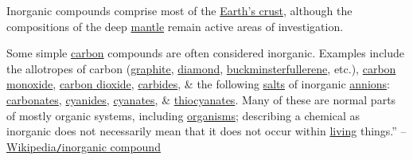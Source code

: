 \documentclass{article}
\begin{document}
Inorganic compounds comprise most of the \href{https://en.wikipedia.org/wiki/Earth%27s_crust}{Earth's crust}, although the compositions of the deep \href{https://en.wikipedia.org/wiki/Mantle_(geology)}{mantle} remain active areas of investigation.

Some simple \href{https://en.wikipedia.org/wiki/Carbon}{carbon} compounds are often considered inorganic. Examples include the allotropes of carbon (\href{https://en.wikipedia.org/wiki/Graphite}{graphite}, \href{https://en.wikipedia.org/wiki/Diamond}{diamond}, \href{https://en.wikipedia.org/wiki/Buckminsterfullerene}{buckminsterfullerene}, etc.), \href{https://en.wikipedia.org/wiki/Carbon_monoxide}{carbon monoxide}, \href{https://en.wikipedia.org/wiki/Carbon_dioxide}{carbon dioxide}, \href{https://en.wikipedia.org/wiki/Carbide}{carbides}, \& the following \href{https://en.wikipedia.org/wiki/Salt_(chemistry)}{salts} of inorganic \href{https://en.wikipedia.org/wiki/Anion}{annions}: \href{https://en.wikipedia.org/wiki/Carbonate}{carbonates}, \href{https://en.wikipedia.org/wiki/Cyanide}{cyanides}, \href{https://en.wikipedia.org/wiki/Cyanate}{cyanates}, \& \href{https://en.wikipedia.org/wiki/Thiocyanate}{thiocyanates}. Many of these are normal parts of mostly organic systems, including \href{https://en.wikipedia.org/wiki/Organism}{organisms}; describing a chemical as inorganic does not necessarily mean that it does not occur within \href{https://en.wikipedia.org/wiki/Life}{living} things.'' -- \href{https://en.wikipedia.org/wiki/Inorganic_compound}{Wikipedia\texttt{/}inorganic compound}


\printbibliography[heading=bibintoc]
	
\end{document}
